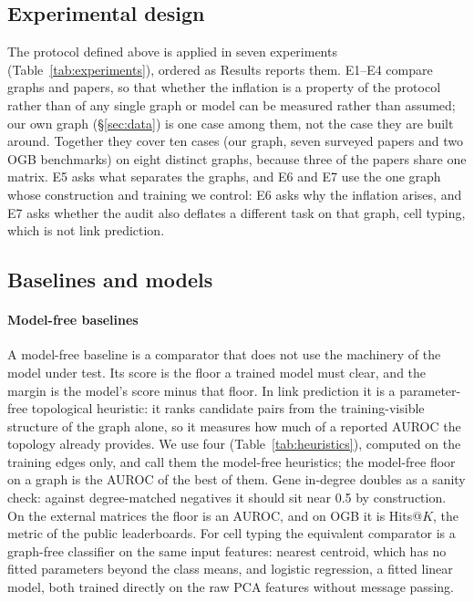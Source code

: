 \documentclass[review]{elsarticle}
\begin{document}

\subsection{Experimental design}
\label{sec:comparison_design}
The protocol defined above is applied in seven experiments (Table~\ref{tab:experiments}),
ordered as Results reports them. E1--E4 compare graphs and papers, so that whether the
inflation is a property of the protocol rather than of any single graph or model can be
measured rather than assumed; our own graph (\S\ref{sec:data}) is one case among them, not
the case they are built around. Together they cover ten cases (our graph, seven surveyed
papers and two OGB benchmarks) on eight distinct graphs, because three of the papers
share one matrix. E5 asks what separates the graphs, and E6 and E7 use the one graph whose
construction and training we control: E6 asks why the inflation arises, and E7 asks whether the
audit also deflates a different task on that graph, cell typing, which is not link prediction.



\subsection{Baselines and models}
\label{sec:baselines}
\paragraph{Model-free baselines} A model-free baseline is a comparator that does not use
the machinery of the model under test. Its score is the floor a trained model must clear,
and the margin is the model's score minus that floor. In link prediction it is a
parameter-free topological heuristic: it ranks candidate pairs from the training-visible
structure of the graph alone, so it measures how much of a reported AUROC the topology
already provides. We use four (Table~\ref{tab:heuristics}), computed on the training edges
only, and call them the model-free heuristics; the model-free floor on a graph is the AUROC
of the best of them. Gene in-degree doubles as a sanity check: against degree-matched
negatives it should sit near 0.5 by construction. On the external matrices the floor is an
AUROC, and on OGB it is Hits@$K$, the metric of the public leaderboards. For cell typing
the equivalent comparator is a graph-free classifier on the same input features: nearest
centroid, which has no fitted parameters beyond the class means, and logistic regression, a
fitted linear model, both trained directly on the raw PCA features without message passing.
\end{document}
